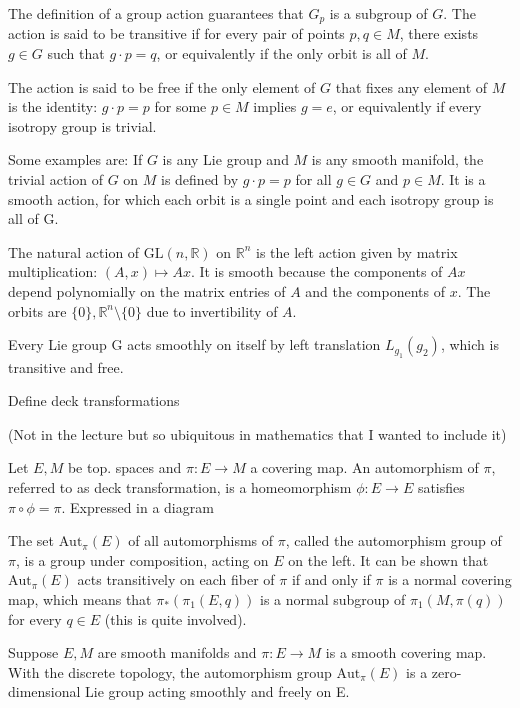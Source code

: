 The definition of a group action guarantees that \(G_p\) is a subgroup of \(G\).
The action is said to be transitive if for every pair of points \(p, q \in M\), there exists \(g \in G\) such that \(g \cdot p = q\), 
or equivalently if the only orbit is all of \(M\).   

The action is said to be free if the only element of \(G\) that fixes any element of \(M\) is the identity: 
\(g \cdot p = p\) for some \(p \in M\) implies \(g = e\), or equivalently if every isotropy group is trivial.   

Some examples are:
If \( G \) is any Lie group and \( M \) is any smooth manifold, the trivial action of \( G \)
on \( M \) is defined by \( g \cdot p = p \) for all \( g \in G \) and \( p \in M \). It is a smooth action,
for which each orbit is a single point and each isotropy group is all of G.

The natural action of \( \text{GL}(n, \mathbb{R}) \) on \( \mathbb{R}^n \) is the left action given by matrix 
multiplication: \( (A,x) \mapsto Ax \). It is smooth because the components of \( Ax \) depend polynomially on
the matrix entries of \( A \) and the components of \( x \). The orbits are \( \{0\}, \mathbb{R}^{n} \setminus \{0\} \)
due to invertibility of \( A \).

Every Lie group G acts smoothly on itself by left translation \( L_{g_1}(g_2) \), which is transitive and free.
 

Define deck transformations

(Not in the lecture but so ubiquitous in mathematics that I wanted to include it)

Let \( E, M \) be top. spaces and \( \pi : E \to M \) a covering map. An automorphism of \( \pi \),
referred to as deck transformation, is a homeomorphism \( \phi : E \to E \) satisfies \( \pi \circ \phi = \pi \).
Expressed in a diagram


The set \(\text{Aut}_\pi(E)\) of all automorphisms of \(\pi\), called the automorphism group of \(\pi\), is a group under composition, 
acting on \(E\) on the left. 
It can be shown that \(\text{Aut}_\pi(E)\) acts transitively on each fiber of \(\pi\) if and only if \(\pi\) is a normal covering map, 
which means that \(\pi_*(\pi_1(E, q))\) is a normal subgroup of \(\pi_1(M, \pi(q))\) for every \(q \in E\) (this is quite involved).

Suppose \( E, M \) are smooth manifolds and \( \pi : E \to M \) is a smooth covering map. 
With the discrete topology, the automorphism group \( \text{Aut}_{\pi}(E) \) is a zero-dimensional Lie group acting 
smoothly and freely on E.


